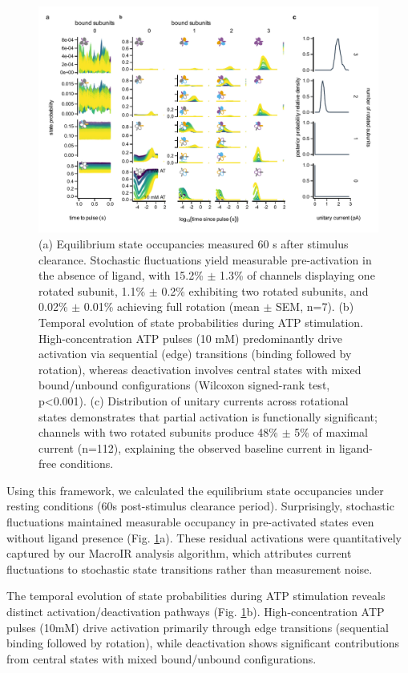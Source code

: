\documentclass[pdflatex,sn-nature]{sn-jnl}%
\theoremstyle{thmstyleone}%
\theoremstyle{thmstyletwo}%
\theoremstyle{thmstylethree}%
\begin{document}
\begin{figure}[t]
	\centering
	\includegraphics[width=\linewidth]{Figure_5_states.pdf}
	\caption{(a) Equilibrium state occupancies measured 60 s after stimulus clearance. Stochastic fluctuations yield measurable pre-activation in the absence of ligand, with 15.2\% $\pm$ 1.3\% of channels displaying one rotated subunit, 1.1\% $\pm$ 0.2\% exhibiting two rotated subunits, and 0.02\% $\pm$ 0.01\% achieving full rotation (mean $\pm$ SEM, n=7). (b) Temporal evolution of state probabilities during ATP stimulation. High-concentration ATP pulses (10 mM) predominantly drive activation via sequential (edge) transitions (binding followed by rotation), whereas deactivation involves central states with mixed bound/unbound configurations (Wilcoxon signed-rank test, p<0.001). (c) Distribution of unitary currents across rotational states demonstrates that partial activation is functionally significant; channels with two rotated subunits produce 48\% $\pm$ 5\% of maximal current (n=112), explaining the observed baseline current in ligand-free conditions.}
	\label{fig:SchemeX_states}
\end{figure}


Using this framework, we calculated the equilibrium state occupancies under resting conditions (60s post-stimulus clearance period). Surprisingly, stochastic fluctuations maintained measurable occupancy in pre-activated states even without ligand presence (Fig. \ref{fig:SchemeX_states}a). These residual activations were quantitatively captured by our MacroIR analysis algorithm, which attributes current fluctuations to stochastic state transitions rather than measurement noise.

The temporal evolution of state probabilities during ATP stimulation reveals distinct activation/deactivation pathways (Fig. \ref{fig:SchemeX_states}b). High-concentration ATP pulses (10mM) drive activation primarily through edge transitions (sequential binding followed by rotation), while deactivation shows significant contributions from central states with mixed bound/unbound configurations. 
\end{document}
